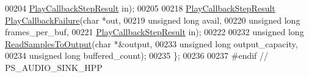\begin{DoxyCode}
00204                                                \hyperlink{classAudioSink_a73002cc57611ac384c4e9d419e706e50}{PlayCallbackStepResult} in);
00205 
00218     \hyperlink{classAudioSink_a73002cc57611ac384c4e9d419e706e50}{PlayCallbackStepResult} \hyperlink{classAudioSink_a6e1b9254b242231ba8168e5e27d602ff}{PlayCallbackFailure}(\textcolor{keywordtype}{char} *out,
00219                                                \textcolor{keywordtype}{unsigned} \textcolor{keywordtype}{long} avail,
00220                                                \textcolor{keywordtype}{unsigned} \textcolor{keywordtype}{long} frames\_per\_buf,
00221                                                \hyperlink{classAudioSink_a73002cc57611ac384c4e9d419e706e50}{PlayCallbackStepResult} in);
00222 
00232     \textcolor{keywordtype}{unsigned} \textcolor{keywordtype}{long} \hyperlink{classAudioSink_a00ed918435d6f65b9533869453d5ae56}{ReadSamplesToOutput}(\textcolor{keywordtype}{char} *&output,
00233                                       \textcolor{keywordtype}{unsigned} \textcolor{keywordtype}{long} output\_capacity,
00234                                       \textcolor{keywordtype}{unsigned} \textcolor{keywordtype}{long} buffered\_count);
00235 \};
00236 
00237 \textcolor{preprocessor}{#endif // PS\_AUDIO\_SINK\_HPP}
\end{DoxyCode}
